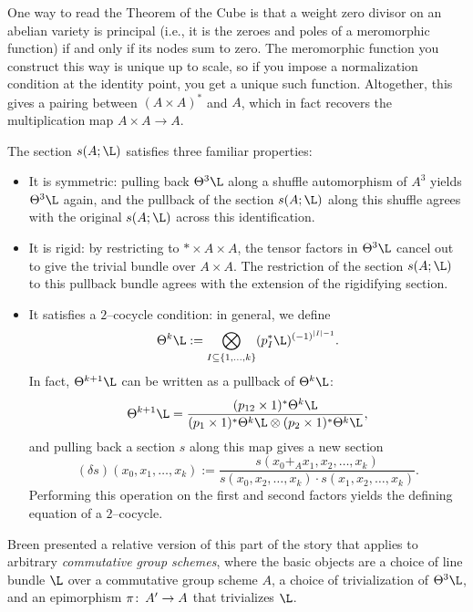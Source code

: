 \begin{remark}
One way to read the Theorem of the Cube is that a weight zero divisor on an abelian variety is principal (i.e., it is the zeroes and poles of a meromorphic function) if and only if its nodes sum to zero.  The meromorphic function you construct this way is unique up to scale, so if you impose a normalization condition at the identity point, you get a unique such function.  Altogether, this gives a pairing between \((A \times A)^*\) and \(A\), which in fact recovers the multiplication map \(A \times A \to A\).
\end{remark}

\begin{remark}
The section \(s(A; \L)\) satisfies three familiar properties:
\begin{itemize}
\item It is symmetric: pulling back \(\Theta^3 \L\) along a shuffle automorphism of \(A^3\) yields \(\Theta^3 \L\) again, and the pullback of the section \(s(A; \L)\) along this shuffle agrees with the original \(s(A; \L)\) across this identification.
\item It is rigid: by restricting to \(* \times A \times A\), the tensor factors in \(\Theta^3 \L\) cancel out to give the trivial bundle over \(A \times A\).  The restriction of the section \(s(A; \L)\) to this pullback bundle agrees with the extension of the rigidifying section.
\item It satisfies a \(2\)--cocycle condition: in general, we define \[\Theta^k \L := \bigotimes_{I \subseteq \{1, \ldots, k\}} (p_I^* \L)^{(-1)^{|I| - 1}}.\]  In fact, \(\Theta^{k+1} \L\) can be written as a pullback of \(\Theta^k \L\): \[\Theta^{k+1} \L = \frac{(p_{12} \times 1)^* \Theta^k \L}{(p_1 \times 1)^* \Theta^k \L \otimes (p_2 \times 1)^* \Theta^k \L},\] and pulling back a section \(s\) along this map gives a new section \[(\delta s)(x_0, x_1, \ldots, x_k) := \frac{s(x_0 +_A x_1, x_2, \ldots, x_k)}{s(x_0, x_2, \ldots, x_k) \cdot s(x_1, x_2, \ldots, x_k)}.\]  Performing this operation on the first and second factors yields the defining equation of a \(2\)--cocycle.
\end{itemize}
\end{remark}

\begin{remark}
Breen presented a relative version of this part of the story that applies to arbitrary \emph{commutative group schemes}, where the basic objects are a choice of line bundle \(\L\) over a commutative group scheme \(A\), a choice of trivialization of \(\Theta^3 \L\), and an epimorphism \(\pi\colon\thinspace A' \to A\) that trivializes \(\L\).
\end{remark}

